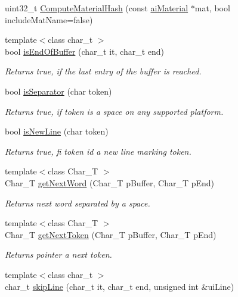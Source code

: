 \begin{DoxyCompactItemize}
\item 
uint32\+\_\+t \hyperlink{namespace_assimp_aeec12ff2ff74693da249187a7c9f1fdd}{Compute\+Material\+Hash} (const \hyperlink{classai_material}{ai\+Material} $\ast$mat, bool include\+Mat\+Name=false)
\item 
{\footnotesize template$<$class char\+\_\+t $>$ }\\bool \hyperlink{namespace_assimp_a98cbb5f7f096bb5e6b42e08d4f65456a}{is\+End\+Of\+Buffer} (char\+\_\+t it, char\+\_\+t end)
\begin{DoxyCompactList}\small\item\em Returns true, if the last entry of the buffer is reached. \end{DoxyCompactList}\item 
bool \hyperlink{namespace_assimp_ac0fa4924a9d69a0c625c44af70de4793}{is\+Separator} (char token)
\begin{DoxyCompactList}\small\item\em Returns true, if token is a space on any supported platform. \end{DoxyCompactList}\item 
bool \hyperlink{namespace_assimp_a85a3905e1425845270407c4b081fa02f}{is\+New\+Line} (char token)
\begin{DoxyCompactList}\small\item\em Returns true, fi token id a new line marking token. \end{DoxyCompactList}\item 
{\footnotesize template$<$class Char\+\_\+\+T $>$ }\\Char\+\_\+\+T \hyperlink{namespace_assimp_a136ee23a615c5889f37d4e22ec7a343a}{get\+Next\+Word} (Char\+\_\+\+T p\+Buffer, Char\+\_\+\+T p\+End)
\begin{DoxyCompactList}\small\item\em Returns next word separated by a space. \end{DoxyCompactList}\item 
{\footnotesize template$<$class Char\+\_\+\+T $>$ }\\Char\+\_\+\+T \hyperlink{namespace_assimp_ada8c8de6132e8d219622b325f3109607}{get\+Next\+Token} (Char\+\_\+\+T p\+Buffer, Char\+\_\+\+T p\+End)
\begin{DoxyCompactList}\small\item\em Returns pointer a next token. \end{DoxyCompactList}\item 
{\footnotesize template$<$class char\+\_\+t $>$ }\\char\+\_\+t \hyperlink{namespace_assimp_a70862408fff68ee98076ad089ee1ae7b}{skip\+Line} (char\+\_\+t it, char\+\_\+t end, unsigned int \&ui\+Line)

\end{DoxyCompactItemize}
